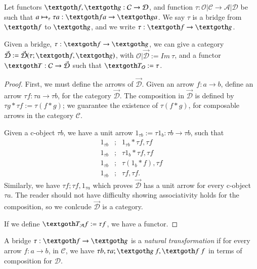\documentclass [12pt]{book}
\begin{document}
Let functors $\textgoth f,\textgoth g:\mathcal C\rightarrow\mathcal D$, and function $\tau:\mathcal{O|C}\rightarrow\mathcal{A|D}$ be such that $a\mapsto_\tau\tau a:\textgoth fa\rightarrow\textgoth ga$. We say $\tau$ is a bridge from $\textgoth f$ to $\textgoth g$, and we write $\tau:\textgoth f\rightarrow\textgoth g$.

\begin{proposition}Given a bridge, $\tau:\textgoth f\rightarrow\textgoth g$, we can give a category $\vec{\mathcal D}:=\vec{\mathcal D}(\tau;\textgoth f,\textgoth g)$, with $\mathcal{O|\vec{D}}:=Im~\tau$, and a functor $\textgoth T:\mathcal C\rightarrow\vec{\mathcal D}$ such that $\textgoth T_\mathcal O:=\tau$. \end{proposition}

\begin{proof}First, we must define the arrows of $\vec{\mathcal D}$. Given an arrow $f:a\rightarrow b$, define an arrow $\tau f:\tau a\rightarrow\tau b$, for the category $\vec{\mathcal D}$. The composition in $\vec{\mathcal D}$ is defined by $\tau g*\tau f:=\tau(f*g)$; we guarantee the existence of $\tau(f*g)$, for composable arrows in the category $\mathcal C$.

Given a c-object $\tau b$, we have a unit arrow $1_{\tau b}:=\tau1_b:\tau b\rightarrow\tau b$, such that\begin{eqnarray}\nonumber 1_{\tau b}&;&1_{\tau b}*\tau f,\tau f\\\nonumber 1_{\tau b}&;&\tau1_{b}*\tau f,\tau f\\\nonumber 1_{\tau b}&;&\tau(1_{b}*f),\tau f\\\nonumber 1_{\tau b}&;&\tau f,\tau f.\end{eqnarray}Similarly, we have $\tau f;\tau f,1_{\tau a}$ which proves $\vec{\mathcal D}$ has a unit arrow for every c-object $\tau a$. The reader should not have difficulty showing associativity holds for the composition, so we conlcude $\vec{\mathcal D}$ is a category.

If we define $\textgoth T_\mathcal Af:=\tau f$, we have a functor.\end{proof}

\begin{definition}A bridge $\tau:\textgoth f\rightarrow\textgoth g$ is a \textit{natural transformation} if for every arrow $f:a\rightarrow b$, in $\mathcal{C}$, we have $\tau b,\tau a;\textgoth g~f,\textgoth f~f$ in terms of composition for $\mathcal D$.\end{definition}
\end{document}
